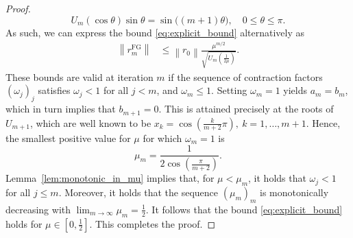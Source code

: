 \documentclass{siamart251216}
\def\Z{\mathbb{Z}}
\begin{document}
{\begin{proof}
    $$
    { U_{m}(\cos \theta )\sin \theta ={\sin }{\big (}(m+1)\theta {)}, \quad  0 \leq \theta \leq \pi.}
    $$ As such, we can express the bound \eqref{eq:explicit_bound} alternatively as
    \begin{equation*} 
        \begin{aligned}
            \left\|r_m^{\mathrm{FG}}\right\| & \leq \left\|r_0\right\| \frac{\mu^{m/2}}{\sqrt{U_m\left(\frac{1}{2\mu}\right)}}.
        \end{aligned}
    \end{equation*}
    These bounds are valid at iteration $m$ if the sequence of contraction factors $(\omega_j)_j$ satisfies $\omega_j < 1$ for all $j < m$, and $\omega_m \leq 1$. Setting $\omega_m = 1$ yields $a_m = b_m$, which in turn implies that $b_{m+1}=0.$ This is attained precisely at the roots of $U_{m+1}$, which are well known to be ${x_{k}=\cos \left({\frac {k}{m+2}}\pi \right),\ k=1,\dots ,m+1.}$ Hence, the smallest positive value for $\mu$ for which $\omega_m = 1$ is
    \begin{equation}\label{eq:mum}
        \mu_m = \frac{1}{2 \cos\left(\frac{\pi}{m+2}\right)}.
    \end{equation}
    Lemma~\ref{lem:monotonic_in_mu} implies that, for $\mu < \mu_m$, it holds that $\omega_j < 1$ for all $j \leq m$. %
    Moreover, it holds that the sequence $(\mu_m)_m$ is monotonically decreasing with $\lim_{m \rightarrow \infty} \mu_m = \frac{1}{2}$. %
    It follows that the bound \eqref{eq:explicit_bound} holds for $\mu \in [0,\frac{1}{2}].$ This completes the proof.
\end{proof}


}
\end{document}
